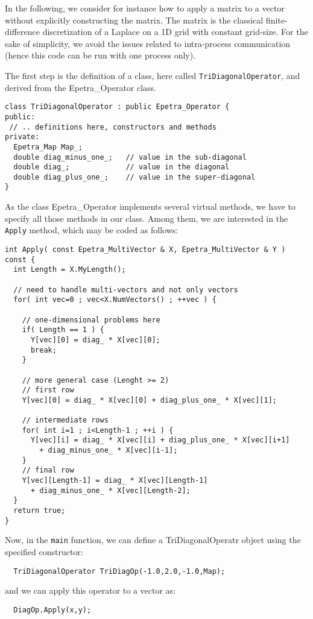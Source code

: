 In the following, we consider for instance how to apply a matrix to a
vector without explicitly constructing the matrix. The matrix is the
classical finite-difference discretization of a Laplace on a 1D grid
with constant grid-size. For the sake of simplicity, we avoid the issues
related to intra-process communication (hence this code can be run with
one process only). 

The first step is the definition of a class, here called
\verb!TriDiagonalOperator!, and derived from the Epetra\_Operator class.
\begin{verbatim}
class TriDiagonalOperator : public Epetra_Operator {
public:
 // .. definitions here, constructors and methods
private:
  Epetra_Map Map_;
  double diag_minus_one_;   // value in the sub-diagonal
  double diag_;             // value in the diagonal
  double diag_plus_one_;    // value in the super-diagonal
}
\end{verbatim}
As the class  Epetra\_Operator implements several virtual methods, we
have to specify all those methods in our class. Among them, we are
interested in the \verb!Apply! method, which may be coded as follows:
\begin{verbatim}
int Apply( const Epetra_MultiVector & X, Epetra_MultiVector & Y ) const {
  int Length = X.MyLength();
  
  // need to handle multi-vectors and not only vectors
  for( int vec=0 ; vec<X.NumVectors() ; ++vec ) {
    
    // one-dimensional problems here
    if( Length == 1 ) {
      Y[vec][0] = diag_ * X[vec][0];
      break;
    }
    
    // more general case (Lenght >= 2)
    // first row
    Y[vec][0] = diag_ * X[vec][0] + diag_plus_one_ * X[vec][1];
    
    // intermediate rows
    for( int i=1 ; i<Length-1 ; ++i ) {
      Y[vec][i] = diag_ * X[vec][i] + diag_plus_one_ * X[vec][i+1]
        + diag_minus_one_ * X[vec][i-1];
    }
    // final row
    Y[vec][Length-1] = diag_ * X[vec][Length-1]
      + diag_minus_one_ * X[vec][Length-2];
  }
  return true;
}
\end{verbatim}
Now, in the \verb!main! function, we can define a TriDiagonalOperatr object
using the specified constructor:
\begin{verbatim}
  TriDiagonalOperator TriDiagOp(-1.0,2.0,-1.0,Map);
\end{verbatim}
and we can apply this operator to a vector as:
\begin{verbatim}
  DiagOp.Apply(x,y);
\end{verbatim}

